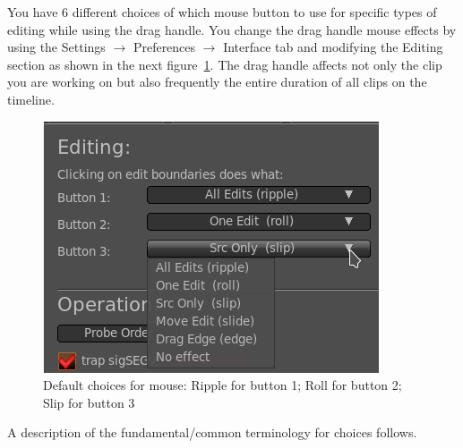 You have 6 different choices of which mouse button to use for specific types of editing while using the drag handle.  You change the drag handle mouse effects by using the Settings $\rightarrow$ Preferences  $\rightarrow$ Interface tab and modifying the Editing section as shown in the next figure~\ref{fig:trim}. The drag handle affects not only the clip you are working on but also frequently the entire duration of all clips on the timeline.\\
\begin{figure}[htpb]
    \centering
    \includegraphics[width=0.6\linewidth]{images/trim.png}
    \caption{Default choices for mouse: Ripple for button 1; Roll for button 2; Slip for button 3}
    \label{fig:trim}
\end{figure}
A description of the fundamental/common terminology for choices follows.
